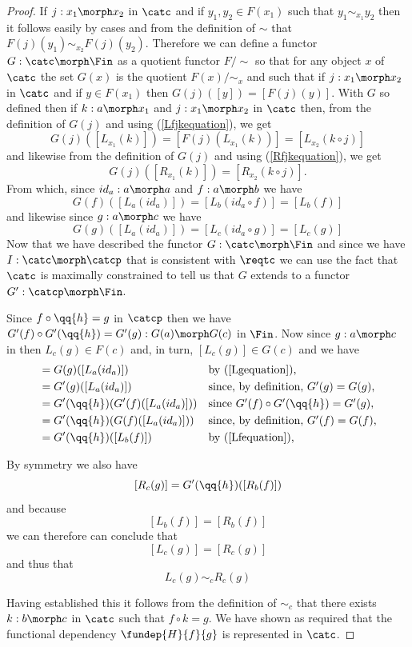 \begin{proof}
If $j: x_1 \morph x_2$ in $\catc$ and if $y_1,y_2 \in F(x_1)$ such that $y_1 \sim_{x_1} y_2$
then it follows easily by cases and from the definition of $\sim$ 
that $F(j)(y_1) \sim_{x_2} F(j)(y_2)$.
Therefore we can define a functor 
 $G: \catc \morph \Fin$  as a quotient functor $F/\sim$ 
 so that for any object $x$ of $\catc$
the set $G(x)$ is the quotient $F(x)/{\sim_x}$ and such that 
if $j: x_1 \morph x_2$ in $\catc$ and if $y \in F(x_1)$ then $G(j)([y])=[F(j)(y)]$.
With $G$ so defined then if $k: a \morph x_1$ and $j:x_1 \morph x_2$ in $\catc$
then, from the definition of $G(j)$ and using  (\ref{Lfjkequation}), we get
\begin{equation*}G(j)([L_{x_1}(k)])=[F(j)(L_{x_1}(k))] =[L_{x_2}(k \circ j)]
\end{equation*}
 and likewise from the definition of $G(j)$ and using  (\ref{Rfjkequation}), we get
\begin{equation*} 
G(j)([R_{x_1}(k)])=[R_{x_2}(k \circ j)].
\end{equation*} 
From which, since $id_a: a \morph a$ and $f:a \morph b$   we have 
\begin{equation}
\label{Lfequation}
G(f)([L_a(id_a)])=[L_{b}(id_a \circ f)]=[L_{b}(f)]
\end{equation}
and likewise since $g:a \morph c$   we have 
\begin{equation}
\label{Lgequation}
G(g)([L_a(id_a)])=[L_{c}(id_a \circ g)]=[L_{c}(g)]
\end{equation}
Now that we have described the functor  $G: \catc \morph \Fin$ 
and since we have $I:\catc \morph \catcp$ that is consistent with $\reqtc$
we can use the fact that $\catc$ is maximally constrained to tell us that $G$ extends to a functor 
$G' : \catcp \morph \Fin$. 

Since $f \circ \qq{h} = g$ in $\catcp$ then we have
 $G'(f) \circ G'(\qq{h}) = G'(g): G(a) \morph G(c)$ in $\Fin$.
Now since $g:a \morph c$ in \catcw then $L_c(g) \in F(c)$ and, in turn, $[L_c(g)] \in G(c)$ and we have
\begin{align*}
[L_c(g)]&= G(g)([L_a(id_a)])              & & \mbox{by (\ref{Lgequation}),}           \\
        &= G'(g)([L_a(id_a)])              & & \mbox{since, by definition, $G'(g)=G(g)$,}  \\
        &= G'(\qq{h}) (G'(f)([L_a(id_a)])) & & \mbox{since $G'(f) \circ G'(\qq{h}) = G'(g)$,}  \\
        &= G'(\qq{h}) (G(f)([L_a(id_a)])) & & \mbox{since, by definition,  $G'(f)=G(f)$,}  \\
	&= G'(\qq{h}) ([L_b(f)])          & & \mbox{by (\ref{Lfequation}),}
\end{align*}

By symmetry we also have
$$[R_c(g)] = G'(\qq{h}) ([R_b(f)])  $$
and because
$$[L_b(f)]=[R_b(f)]$$
we can therefore can conclude that
$$[L_c(g)] = [R_c(g)]$$
and thus that
$$ L_c(g) \sim_c R_c(g)$$

Having established this
it follows from the definition of $\sim_c$ that there exists $k:b \morph c$ in 
$\catc$ such that $f \circ k = g$.    
We have shown as required that the functional dependency
$\fundep{H}{f}{g}$ is represented in $\catc$.
\end{proof}

